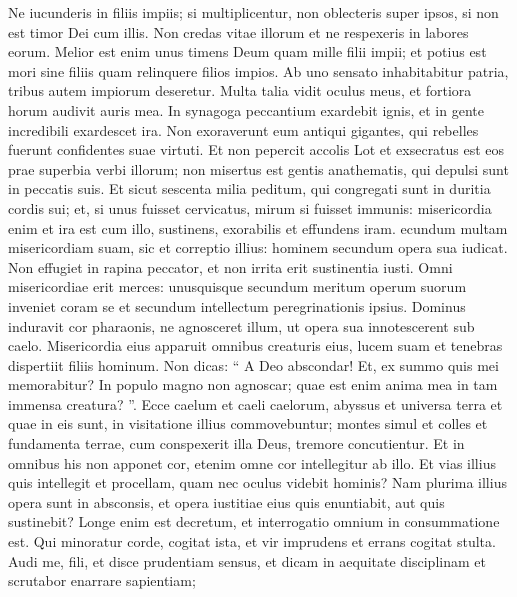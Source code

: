 \begin{biblechapter}
\begin{biblechapter}
\begin{biblechapter}
\begin{biblechapter}
\begin{biblechapter}
\begin{biblechapter}
\begin{biblechapter}
\begin{biblechapter}
\begin{biblechapter}
\begin{biblechapter}
\begin{biblechapter}
\begin{biblechapter}
\begin{biblechapter}
\begin{biblechapter}
\begin{biblechapter}
\begin{biblechapter}
\verse Ne iucunderis in filiis impiis; si multiplicentur, non oblecteris super ipsos,
 si non est timor Dei cum illis.
 \verse Non credas vitae illorum
 et ne respexeris in labores eorum.
 \verse Melior est enim unus timens Deum
 quam mille filii impii;
 \verse et potius est mori sine filiis
 quam relinquere filios impios.
 \verse Ab uno sensato inhabitabitur patria,
 tribus autem impiorum deseretur.
 \verse Multa talia vidit oculus meus,
 et fortiora horum audivit auris mea.
 \verse In synagoga peccantium exardebit ignis,
 et in gente incredibili exardescet ira.
 \verse Non exoraverunt eum antiqui gigantes,
 qui rebelles fuerunt confidentes suae virtuti.
 \verse Et non pepercit accolis Lot
 et exsecratus est eos prae superbia verbi illorum;
 \verse non misertus est gentis anathematis,
 qui depulsi sunt in peccatis suis.
 \verse Et sicut sescenta milia peditum,
 qui congregati sunt in duritia cordis sui;
 et, si unus fuisset cervicatus,
 mirum si fuisset immunis:
 \verse misericordia enim et ira est cum illo,
 sustinens, exorabilis et effundens iram.
 \verse ecundum multam misericordiam suam, sic et correptio illius:
 hominem secundum opera sua iudicat.
 \verse Non effugiet in rapina peccator,
 et non irrita erit sustinentia iusti.
 \verse Omni misericordiae erit merces:
 unusquisque secundum meritum operum suorum inveniet coram se
 et secundum intellectum peregrinationis ipsius.
 Dominus induravit cor pharaonis, ne agnosceret illum,
 ut opera sua innotescerent sub caelo.
 Misericordia eius apparuit omnibus creaturis eius,
 lucem suam et tenebras dispertiit filiis hominum.
 \verse Non dicas: “ A Deo abscondar!
 Et, ex summo quis mei memorabitur?
 \verse In populo magno non agnoscar;
 quae est enim anima mea in tam immensa creatura? ”.
 \verse Ecce caelum et caeli caelorum,
 abyssus et universa terra et quae in eis sunt,
 in visitatione illius commovebuntur;
 \verse montes simul et colles et fundamenta terrae,
 cum conspexerit illa Deus, tremore concutientur.
 \verse Et in omnibus his non apponet cor,
 etenim omne cor intellegitur ab illo.
 \verse Et vias illius quis intellegit
 et procellam, quam nec oculus videbit hominis?
 \verse Nam plurima illius opera sunt in absconsis,
 et opera iustitiae eius quis enuntiabit, aut quis sustinebit?
 Longe enim est decretum,
 et interrogatio omnium in consummatione est.
 \verse Qui minoratur corde, cogitat ista,
 et vir imprudens et errans cogitat stulta.
 \verse Audi me, fili, et disce prudentiam sensus,
 \verse et dicam in aequitate disciplinam
 et scrutabor enarrare sapientiam;

\end{biblechapter}
\end{biblechapter}
\end{biblechapter}
\end{biblechapter}
\end{biblechapter}
\end{biblechapter}
\end{biblechapter}
\end{biblechapter}
\end{biblechapter}
\end{biblechapter}
\end{biblechapter}
\end{biblechapter}
\end{biblechapter}
\end{biblechapter}
\end{biblechapter}
\end{biblechapter}
